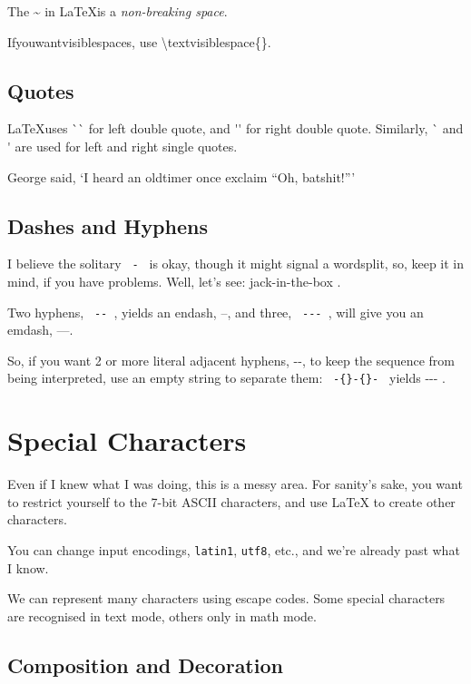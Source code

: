 The \~{} in \LaTeX is a \emph{non-breaking space}.

If\textvisiblespace{}you\textvisiblespace{}want\textvisiblespace{}visible\textvisiblespace{}spaces,
use \textbackslash{}textvisiblespace\{\}.


\subsection{Quotes}
\label{basicquotes}

\LaTeX uses \`{}\`{} for left double quote, and \'{}\'{} for right double quote.
Similarly, \`{} and \'{} are used for left and right single quotes.

George said, `I heard an oldtimer once exclaim ``Oh, batshit!''{}'


\subsection{Dashes and Hyphens}

I believe the solitary \texttt{ - } is okay, though it might signal a
wordsplit, so, keep it in mind, if you have problems.  Well, let's see:
jack-in-the-box .

Two hyphens, \texttt{ -{}- }, yields an endash, --, and three, \texttt{
	-{}-{}- },  will give you an emdash, ---.

So, if you want 2 or more literal adjacent hyphens, -{}-, to keep the
sequence from being interpreted, use an empty string to separate them:
\texttt{ -\{\}-\{\}- } yields -{}-{}- .


\section{Special Characters}
\label{specchars}

Even if I knew what I was doing, this is a messy area.  For sanity's sake,
you want to restrict yourself to the 7-bit ASCII characters, and use \LaTeX
to create other characters.

You can change input encodings, \texttt{latin1}, \texttt{utf8}, etc., and
we're already past what I know.

We can represent many characters using escape codes.  Some special
characters are recognised in text mode, others only in math mode.

\subsection{Composition and Decoration}

